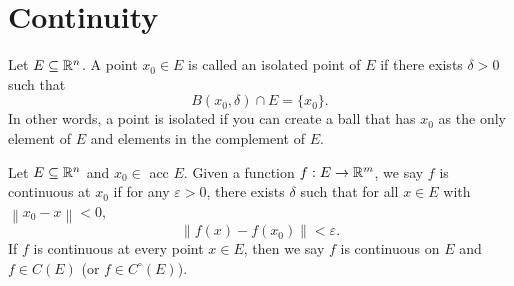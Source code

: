 \documentclass[11pt]{article}
\newcommand{\norm}[1]{\left\lVert #1 \right\rVert}
\newcommand{\ra}{\rightarrow}
\begin{document}
\section{Continuity}
\begin{definition}
    Let $E \subseteq \mathbb{R}^n$. A point $x_0 \in E$ is called an isolated point of $E$ if there exists $\delta >0$ such that 
    \[B(x_0,\delta) \cap E = \{x_0\}.\]
    In other words, a point is isolated if you can create a ball that has $x_0$ as the only element of $E$ and elements in the complement of $E$.
\end{definition}
\begin{definition}
    Let $E \subseteq \mathbb{R}^n$ and $x_0 \in$ acc $E$. Given a function $f: E \ra \R^m$, we say $f$ is continuous at $x_0$ if for any $\varepsilon > 0$, there exists $\delta$ such that for all $x \in E$ with $\norm{x_0 - x} < 0$, 
    \[\norm{f(x) - f(x_0)} < \varepsilon.\]
    If $f$ is continuous at every point $x \in E$, then we say $f$ is continuous on $E$ and $f \in C(E)$ (or $f \in C^\circ(E)$). 
\end{definition}
\end{document}
